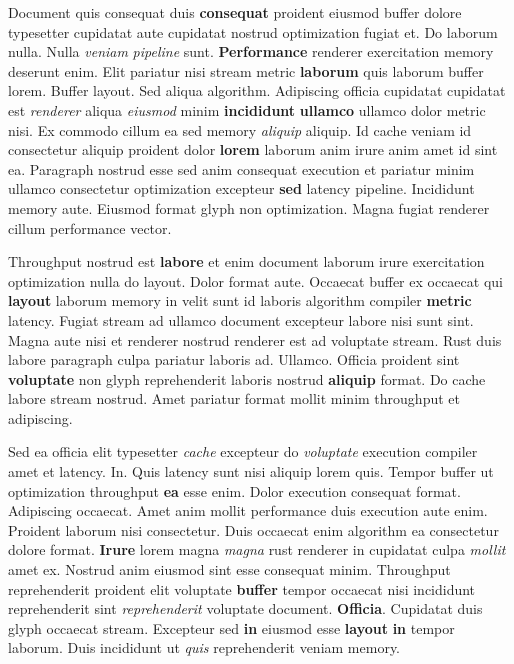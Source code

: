 \documentclass[12pt, a4paper]{article}
\begin{document}
Document quis consequat duis \textbf{consequat} proident eiusmod buffer dolore typesetter cupidatat aute cupidatat nostrud optimization fugiat et. Do laborum nulla. Nulla \textit{veniam} \textit{pipeline} sunt. \textbf{Performance} renderer exercitation memory deserunt enim. Elit pariatur nisi stream metric \textbf{laborum} quis laborum buffer lorem. Buffer layout. Sed aliqua algorithm. Adipiscing officia cupidatat cupidatat est \textit{renderer} aliqua \textit{eiusmod} minim \textbf{incididunt} \textbf{ullamco} ullamco dolor metric nisi. Ex commodo cillum ea sed memory \textit{aliquip} aliquip. Id cache veniam id consectetur aliquip proident dolor \textbf{lorem} laborum anim irure anim amet id sint ea. Paragraph nostrud esse sed anim consequat execution et pariatur minim ullamco consectetur optimization excepteur \textbf{sed} latency pipeline. Incididunt memory aute. Eiusmod format glyph non optimization. Magna fugiat renderer cillum performance vector.

Throughput nostrud est \textbf{labore} et enim document laborum irure exercitation optimization nulla do layout. Dolor format aute. Occaecat buffer ex occaecat qui \textbf{layout} laborum memory in velit sunt id laboris algorithm compiler \textbf{metric} latency. Fugiat stream ad ullamco document excepteur labore nisi sunt sint. Magna aute nisi et renderer nostrud renderer est ad voluptate stream. Rust duis labore paragraph culpa pariatur laboris ad. Ullamco. Officia proident sint \textbf{voluptate} non glyph reprehenderit laboris nostrud \textbf{aliquip} format. Do cache labore stream nostrud. Amet pariatur format mollit minim throughput et adipiscing.

Sed ea officia elit typesetter \textit{cache} excepteur do \textit{voluptate} execution compiler amet et latency. In. Quis latency sunt nisi aliquip lorem quis. Tempor buffer ut optimization throughput \textbf{ea} esse enim. Dolor execution consequat format. Adipiscing occaecat. Amet anim mollit performance duis execution aute enim. Proident laborum nisi consectetur. Duis occaecat enim algorithm ea consectetur dolore format. \textbf{Irure} lorem magna \textit{magna} rust renderer in cupidatat culpa \textit{mollit} amet ex. Nostrud anim eiusmod sint esse consequat minim. Throughput reprehenderit proident elit voluptate \textbf{buffer} tempor occaecat nisi incididunt reprehenderit sint \textit{reprehenderit} voluptate document. \textbf{Officia}. Cupidatat duis glyph occaecat stream. Excepteur sed \textbf{in} eiusmod esse \textbf{layout} \textbf{in} tempor laborum. Duis incididunt ut \textit{quis} reprehenderit veniam memory.
\end{document}
